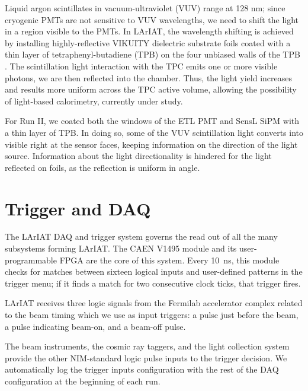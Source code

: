 Liquid argon scintillates in vacuum-ultraviolet (VUV) range at 128 nm; since cryogenic PMTs are not sensitive to VUV wavelengths, we need to shift the light in a region visible to the PMTs. In LArIAT, the wavelength shifting is achieved by installing highly-reflective VIKUITY dielectric substrate foils coated with a thin layer of tetraphenyl-butadiene (TPB)  on the four unbiased walls of the TPB . The scintillation light interaction with the TPC emits one or more visible photons, we are then reflected into the chamber. Thus, the light yield increases and results more uniform across the TPC active volume, allowing the possibility of light-based calorimetry, currently under study.

For Run II, we coated both  the windows of the ETL PMT and SensL SiPM  with a thin layer of TPB. In doing so, some of the VUV scintillation light converts into visible right at the sensor faces, keeping information on the direction of the light source. Information about the light directionality is hindered for the light reflected on foils, as the reflection is uniform in angle. %



\section{Trigger and DAQ}
The LArIAT DAQ and trigger system governs the read out of all the many subsystems forming LArIAT. 
The CAEN V1495 module and its user-programmable FPGA  are the core of this system.  Every 10~ns, this module checks for matches between sixteen logical inputs and user-defined patterns in the trigger menu; if it finds a match for two consecutive clock ticks, that trigger fires.

LArIAT receives three logic signals from the Fermilab accelerator complex related to the beam timing which we use as input triggers: a pulse just  before the beam, a pulse indicating beam-on, and a beam-off pulse.

The beam instruments,  the cosmic ray taggers, and the light collection system provide the other NIM-standard logic pulse inputs to the trigger decision. We automatically log the trigger inputs configuration with the rest of the DAQ configuration at the beginning of each run.

